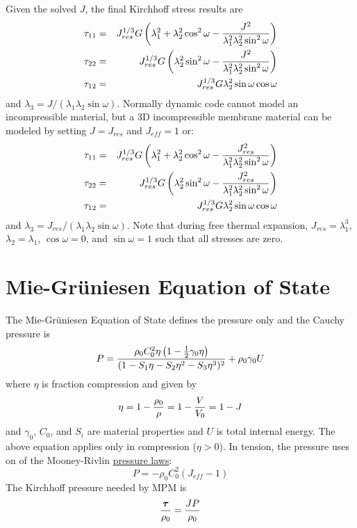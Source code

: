\documentclass[11pt]{book}
\newcommand{\tens}[1]{\boldsymbol{\mathsf{#1}}}
\def\Jeff{J_{eff}}
\def\Jres{J_{res}}
\begin{document}
Given the solved $J$, the final Kirchhoff stress results are
\begin{eqnarray}
      \tau_{11} & = &  \Jres^{1/3}G \left(\lambda_1^2 + \lambda_2^2\cos^2\omega-{J^2\over\lambda_1^2\lambda_2^2\sin^2\omega}\right) \\
      \tau_{22} & = & \Jres^{1/3}G \left( \lambda_2^2\sin^2\omega-{J^2\over\lambda_1^2\lambda_2^2\sin^2\omega}\right) \\
      \tau_{12} & = & \Jres^{1/3}G \lambda_2^2\sin\omega\cos\omega
\end{eqnarray}
and $\lambda_3 = J/(\lambda_1\lambda_2\sin\omega)$. Normally dynamic code cannot model an incompressible material, but a 3D incompressible membrane material can be modeled by setting $J=\Jres$ and $\Jeff=1$ or:
\begin{eqnarray}
      \tau_{11} & = &  \Jres^{1/3}G \left(\lambda_1^2 + \lambda_2^2\cos^2\omega-{\Jres^2\over\lambda_1^2\lambda_2^2\sin^2\omega}\right) \\
      \tau_{22} & = & \Jres^{1/3}G \left( \lambda_2^2\sin^2\omega-{\Jres^2\over\lambda_1^2\lambda_2^2\sin^2\omega}\right) \\
      \tau_{12} & = & \Jres^{1/3}G \lambda_2^2\sin\omega\cos\omega
\end{eqnarray}
and $\lambda_3 = \Jres/(\lambda_1\lambda_2\sin\omega)$. Note that during free thermal expansion, $\Jres=\lambda_1^3$, $\lambda_2=\lambda_1$, $\cos\omega=0$, and $\sin\omega=1$ such that all stresses are zero.

\section{Mie-Gr\"{u}niesen Equation of State}

The Mie-Gr\"{u}niesen Equation of State defines the pressure only and the Cauchy pressure is
\begin{equation}
       P = {\rho_0 C_0^2 \eta \left(1 - {1\over 2}\gamma_0 \eta\right) \over (1 - S_1\eta - S_2\eta^2 - S_3 \eta^3)^2} + \rho_0\gamma_0 U
\end{equation}
where $\eta$ is fraction compression and given by
\begin{equation}
    \eta = 1 - {\rho_0\over \rho} = 1 - {V\over V_0} = 1 - J
\end{equation}
and $\gamma_0$, $C_0$, and $S_i$ are material properties and $U$ is total internal energy. The above equation applies only in compression ($\eta>0$). In tension, the pressure uses on of the Mooney-Rivlin \hyperref[PTerms]{pressure laws}:
\begin{equation}
      P = -\rho_0 C_0^2(\Jeff-1)
\end{equation}
The Kirchhoff pressure needed by MPM is
\begin{equation}
   {\tens\tau\over\rho_0} = {JP\over\rho_0}
\end{equation}
\end{document}
